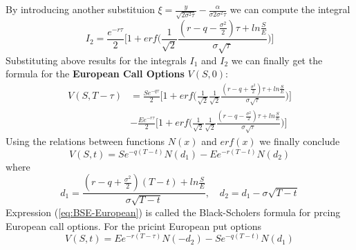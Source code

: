\documentclass[a4paper]{article}
\begin{document}
\begin{itemize}
By introducing another substituion $\xi = \frac{y}{\sqrt{2\sigma^2 \tau}} - \frac{\alpha}{\sigma{2\sigma^2 \tau}}$ we can compute the integral
\begin{equation}
    I_2 = \frac{e^{-r \tau}}{2} \bigg[ 1 + erf \bigg( \frac{1}{\sqrt{2}} \frac{(r-q-\frac{\sigma^2}{2})\tau + ln\frac{S}{E}}{\sigma \sqrt{\tau}}\bigg) \bigg]
\end{equation}
Substituting above results for the integrals $I_1$ and $I_2$ we can finally get the formula for the \textbf{European Call Options} $V(S, 0)$:
\begin{align}
    V(S, T-\tau) &= \frac{Se^{-q\tau}}{2} \bigg[ 1 + erf \bigg( \frac{1}{\sqrt{2}} \frac{1}{\sqrt{2}} \frac{(r - q + \frac{\sigma^2}{2}) \tau + ln \frac{S}{E}}{\sigma \sqrt{\tau}} \bigg) \bigg]\\
                &- \frac{E e^{-r \tau}}{2} \bigg[ 1 + erf \bigg( \frac{1}{\sqrt{2}} \frac{1}{\sqrt{2}} \frac{(r - q - \frac{\sigma^2}{2}) \tau + ln \frac{S}{E}}{\sigma \sqrt{\tau}} \bigg) \bigg]
\end{align}
Using the relations between functions $N(x)$ and $erf(x)$ we finally conclude
\begin{equation}
    \label{eq:BSE-European}
    V(S,t) = S e^{-q(T-t)} N(d_1) - E e^{-r(T-t)} N(d_2)
\end{equation}
where
\begin{equation}
    d_1 = \frac{(r - q + \frac{\sigma^2}{2}) (T - t) + ln \frac{S}{E}}{\sigma \sqrt{T-t}}, \quad d_2 = d_1 - \sigma\sqrt{T-t}
\end{equation}
Expression (\ref{eq:BSE-European}) is called the Black-Scholers formula for prcing European call options. For the pricint European put options
\begin{equation}
    V(S,t) = Ee^{-r(T-\tau)}N(-d_2) - Se^{-q(T-t)}N(d_1)
\end{equation}

\end{itemize}
\end{document}
